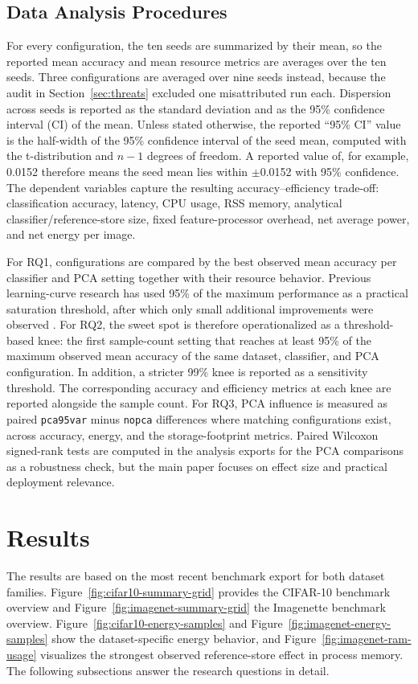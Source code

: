 \documentclass[sigconf,review,nonacm]{acmart}
\begin{document}
\subsection{Data Analysis Procedures}
\label{sec:analysis}
For every configuration, the ten seeds are summarized by their mean, so the reported mean accuracy and mean resource metrics are averages over the ten seeds. Three configurations are averaged over nine seeds instead, because the audit in Section~\ref{sec:threats} excluded one misattributed run each.
Dispersion across seeds is reported as the standard deviation and as the 95\% confidence interval (CI) of the mean.
Unless stated otherwise, the reported ``95\% CI'' value is the half-width of the 95\% confidence interval of the seed mean, computed with the t-distribution and $n-1$ degrees of freedom. A reported value of, for example, 0.0152 therefore means the seed mean lies within $\pm$0.0152 with 95\% confidence.
The dependent variables capture the resulting accuracy--efficiency trade-off: classification accuracy, latency, CPU usage, RSS memory, analytical classifier/reference-store size, fixed feature-processor overhead, net average power, and net energy per image.

For RQ1, configurations are compared by the best observed mean accuracy per classifier and PCA setting together with their resource behavior.
Previous learning-curve research has used 95\% of the maximum performance as a practical saturation threshold, after which only small additional improvements were observed \cite{sliwowski2023impact}. For RQ2, the sweet spot is therefore operationalized as a threshold-based knee: the first sample-count setting that reaches at least 95\% of the maximum observed mean accuracy of the same dataset, classifier, and PCA configuration. In addition, a stricter 99\% knee is reported as a sensitivity threshold. The corresponding accuracy and efficiency metrics at each knee are reported alongside the sample count.
For RQ3, PCA influence is measured as paired \texttt{pca95var} minus \texttt{nopca} differences where matching configurations exist, across accuracy, energy, and the storage-footprint metrics.
Paired Wilcoxon signed-rank tests are computed in the analysis exports for the PCA comparisons as a robustness check, but the main paper focuses on effect size and practical deployment relevance.

\section{Results}
\label{sec:results}
The results are based on the most recent benchmark export for both dataset families.
Figure~\ref{fig:cifar10-summary-grid} provides the CIFAR-10 benchmark overview and Figure~\ref{fig:imagenet-summary-grid} the Imagenette benchmark overview.
Figure~\ref{fig:cifar10-energy-samples} and Figure~\ref{fig:imagenet-energy-samples} show the dataset-specific energy behavior, and Figure~\ref{fig:imagenet-ram-usage} visualizes the strongest observed reference-store effect in process memory.
The following subsections answer the research questions in detail.
\end{document}

